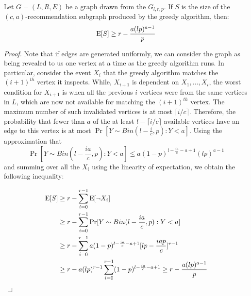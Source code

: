 \begin{thm}
Let $G=(L,R,E)$ be a graph drawn from the $G_{l,r,p}$. If $S$ is the size of the $(c,a)$-recommendation subgraph produced by the greedy algorithm, then:
\[ \text{E}[S] \geq r - \frac{a(lp)^{a-1}}{p}\]
\end{thm}
\begin{proof}
Note that if edges are generated uniformly, we can consider the
graph as being revealed to us one vertex at a time as the greedy
algorithm runs. In particular, consider the event $X_i$ that the
greedy algorithm matches the $(i+1)^{th}$ vertex it inspects. While,
$X_{i+1}$ is dependent on $X_1,\ldots, X_i$, the worst condition for
$X_{i+1}$ is when all the previous $i$ vertices were from the same
vertices in $L$, which are now not available for matching the
$(i+1)^{th}$ vertex. The maximum number of such invalidated vertices
is at most $\lceil i/c \rceil$. Therefore, the probability that fewer
than $a$ of the at least $l-\lceil i/c \rceil $ available 
vertices have an edge to this vertex is at most $\Pr[Y\sim Bin(l-\frac{i}{c},p): Y < a]$.
Using the approximation that
\[ \Pr[Y\sim Bin(l-\frac{ia}{c},p): Y < a] \leq a(1-p)^{l-\frac{ia}{c}-a+1}(lp)^{a-1}\]
and summing over all the $X_i$ using the linearity of expectation,
we obtain the following inequality:

\begin{align*}
      \text{E}[S]
&\geq r - \sum_{i=0}^{r-1} \text{E}[\lnot X_i] \\
&\geq r - \sum_{i=0}^{r-1} \Pr[Y \sim Bin(l-\frac{ia}{c},p): Y < a] \\
&\geq r - \sum_{i=0}^{r-1}a(1-p)^{l-\frac{ia}{c}-a+1}[lp-\frac{iap}{c}]^{r-1} \\
&\geq r - a(lp)^{r-1}\sum_{i=0}^{r-1}(1-p)^{l-\frac{ia}{c}-a+1} \geq r - \frac{a(lp)^{a-1}}{p}\\
\end{align*}
\end{proof} 
